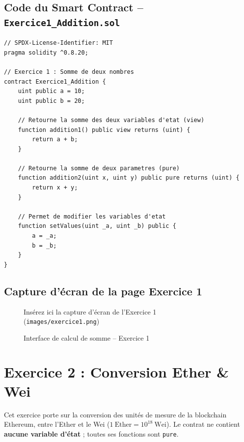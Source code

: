\documentclass[12pt,a4paper]{report}
\begin{document}
\subsection{Code du Smart Contract -- \texttt{Exercice1\_Addition.sol}}
\begin{lstlisting}[language=Solidity, caption={Contrat Addition.sol -- fonctions view et pure}]
// SPDX-License-Identifier: MIT
pragma solidity ^0.8.20;

// Exercice 1 : Somme de deux nombres
contract Exercice1_Addition {
    uint public a = 10;
    uint public b = 20;

    // Retourne la somme des deux variables d'etat (view)
    function addition1() public view returns (uint) {
        return a + b;
    }

    // Retourne la somme de deux parametres (pure)
    function addition2(uint x, uint y) public pure returns (uint) {
        return x + y;
    }

    // Permet de modifier les variables d'etat
    function setValues(uint _a, uint _b) public {
        a = _a;
        b = _b;
    }
}
\end{lstlisting}

\subsection{Capture d'écran de la page Exercice 1}
\begin{figure}[h!]
    \centering
    \begin{tcolorbox}[colback=red!5,colframe=red!50!black,title=Capture d'écran manquante]
        Insérez ici la capture d'écran de l'Exercice 1 (\texttt{images/exercice1.png})
    \end{tcolorbox}
    \caption{Interface de calcul de somme -- Exercice 1}
\end{figure}

\newpage

\section{Exercice 2 : Conversion Ether \& Wei}
Cet exercice porte sur la conversion des unités de mesure de la blockchain Ethereum,
entre l'Ether et le Wei ($1\ \text{Ether} = 10^{18}\ \text{Wei}$). Le contrat ne contient
\textbf{aucune variable d'état} ; toutes ses fonctions sont \texttt{pure}.
\end{document}
